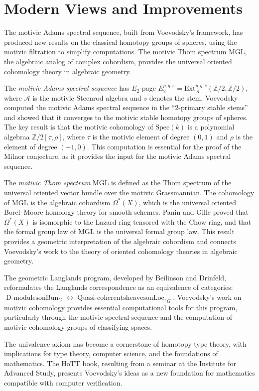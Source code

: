 \section{Modern Views and Improvements}

The motivic Adams spectral sequence, built from Voevodsky's framework, has produced new results on the classical homotopy groups of spheres, using the motivic filtration to simplify computations. The motivic Thom spectrum MGL, the algebraic analog of complex cobordism, provides the universal oriented cohomology theory in algebraic geometry.

The \emph{motivic Adams spectral sequence} has $E_2$-page $E_2^{p,q,s} = \text{Ext}^{p,q,s}_{\mathcal{A}}(\mathbb{Z}/2, \mathbb{Z}/2)$, where $\mathcal{A}$ is the motivic Steenrod algebra and $s$ denotes the stem. Voevodsky computed the motivic Adams spectral sequence in the ``2-primary stable stems'' and showed that it converges to the motivic stable homotopy groups of spheres. The key result is that the motivic cohomology of $\text{Spec}(k)$ is a polynomial algebraa $\mathbb{Z}/2[\tau, \rho]$, where $\tau$ is the motivic element of degree $(0,1)$ and $\rho$ is the element of degree $(-1,0)$. This computation is essential for the proof of the Milnor conjecture, as it provides the input for the motivic Adams spectral sequence.

The \emph{motivic Thom spectrum} MGL is defined as the Thom spectrum of the universal oriented vector bundle over the motivic Grassmannian. The cohomology of MGL is the algebraic cobordism $\Omega^*(X)$, which is the universal oriented Borel--Moore homology theory for smooth schemes. Panin and Gille proved that $\Omega^*(X)$ is isomorphic to the Lazard ring tensored with the Chow ring, and that the formal group law of MGL is the universal formal group law. This result provides a geometric interpretation of the algebraic cobordism and connects Voevodsky's work to the theory of oriented cohomology theories in algebraic geometry.

The geometric Langlands program, developed by Beilinson and Drinfeld, reformulates the Langlands correspondence as an equivalence of categories: $\operatorname{D-modules on Bun}_G \leftrightarrow \operatorname{Quasi-coherent sheaves on Loc}_{{}^L G}$. Voevodsky's work on motivic cohomology provides essential computational tools for this program, particularly through the motivic spectral sequence and the computation of motivic cohomology groups of classifying spaces.

The univalence axiom has become a cornerstone of homotopy type theory, with implications for type theory, computer science, and the foundations of mathematics. The HoTT book, resulting from a seminar at the Institute for Advanced Study, presents Voevodsky's ideas as a new foundation for mathematics compatible with computer verification.

